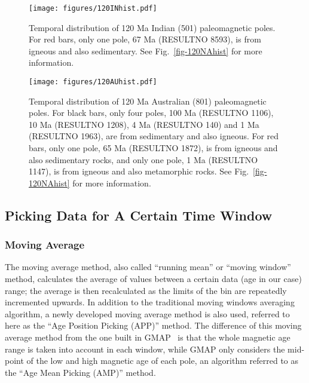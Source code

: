 \begin{figure*}
\centering
\texttt{[image: figures/120INhist.pdf]}
\caption[Distribution of 120 Ma Indian poles]{Temporal distribution
of 120 Ma Indian (501) paleomagnetic poles. For red bars, only one
pole, 67 Ma (RESULTNO 8593), is from igneous and also sedimentary.
See Fig.~\ref{fig-120NAhist} for more information.}\label{fig-120INhist}
\end{figure*}

\begin{figure*}
\centering
\texttt{[image: figures/120AUhist.pdf]}
\caption[Distribution of 120 Ma Australian poles]{Temporal
distribution of 120 Ma Australian (801) paleomagnetic poles. For
black bars, only four poles, 100 Ma (RESULTNO 1106), 10
Ma (RESULTNO 1208), 4 Ma (RESULTNO 140) and 1 Ma
(RESULTNO 1963), are from sedimentary and also igneous. For red bars, only one
pole, 65 Ma (RESULTNO 1872), is from igneous and also sedimentary
rocks, and only one pole, 1 Ma (RESULTNO 1147), is from igneous and
also metamorphic rocks. See
Fig.~\ref{fig-120NAhist} for more information.}\label{fig-120AUhist}
\end{figure*}

\subsection{Picking Data for A Certain Time Window}

\subsubsection{Moving Average}

The moving average method, also called ``running mean'' or ``moving
window''~\cite{T08} method, calculates the average of values between a certain
data (age in our case) range; the average is then recalculated as the limits of
the bin are repeatedly incremented upwards. In addition to the traditional
moving windows averaging algorithm, a newly developed moving average method is
also used, referred to here as the ``Age Position Picking (APP)'' method. The
difference of this moving average method from the one built in
GMAP~\cite{T99,T08} is that the whole magnetic age range is taken into account
in each window, while GMAP only considers the mid-point of the low and high
magnetic age of each pole, an algorithm referred to as the ``Age Mean Picking
(AMP)'' method.

